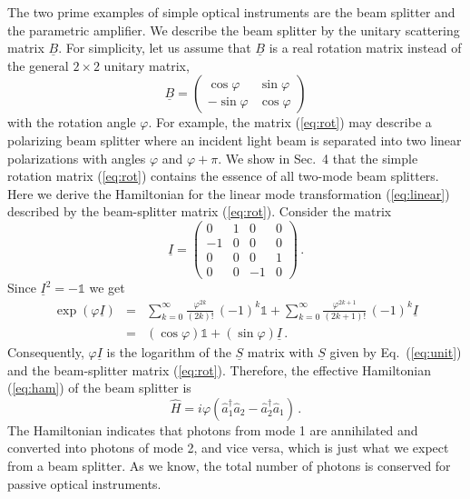 \documentclass[12pt,amsmath,amssymb]{article}
\numberwithin{equation}{section}
\begin{document}
The two prime examples of simple optical instruments are the beam
splitter and the parametric amplifier. We describe the beam
splitter by the unitary scattering matrix $\underline{B}$. For
simplicity, let us assume that $\underline{B}$ is a real rotation
matrix instead of the general $2 \times 2$ unitary matrix,
\begin{equation}
\label{eq:rot} \underline{B} = \left(
    \begin{array}{cc}
      \cos\varphi & \sin\varphi \\
       -\sin\varphi & \cos\varphi
    \end{array}
\right)
\end{equation}
with the rotation angle $\varphi$. For example, the matrix
(\ref{eq:rot}) may describe a polarizing beam splitter where an
incident light beam is separated into two linear polarizations
with angles $\varphi$ and $\varphi+\pi$. We show in Sec.\ 4 that
the simple rotation matrix (\ref{eq:rot}) contains the essence of
all two-mode beam splitters. Here we derive the Hamiltonian for
the linear mode transformation (\ref{eq:linear}) described by the
beam-splitter matrix (\ref{eq:rot}). Consider the matrix
\begin{equation}
\underline{I} =
    \left(
    \begin{array}{cccc}
      0&1&0&0\\-1&0&0&0\\0&0&0&1\\0&0&-1&0
    \end{array}
\right) \,.
\end{equation}
Since $\underline{I}^2 = -\mathds{1}$ we get
\begin{eqnarray}
\exp(\varphi\underline{I}) &=& \sum_{k=0}^\infty
\frac{\varphi^{2k}}{(2k)!}\,(-1)^k \mathds{1} + \sum_{k=0}^\infty
\frac{\varphi^{2k+1}}{(2k+1)!}\,(-1)^k \underline{I} \nonumber\\
&=& (\cos\varphi)\mathds{1} + (\sin\varphi) \underline{I} \,.
\end{eqnarray}
Consequently, $\varphi\underline{I}$ is the logarithm of the
$\underline{S}$ matrix with $\underline{S}$ given by Eq.\
(\ref{eq:unit}) and the beam-splitter matrix (\ref{eq:rot}).
Therefore, the effective Hamiltonian
(\ref{eq:ham}) of the beam splitter is
\begin{equation}
\label{eq:hbeam} \hat{H} =
i\varphi\left(\hat{a}_1^\dagger\hat{a}_2 -
\hat{a}_2^\dagger\hat{a}_1\right) \,.
\end{equation}
The Hamiltonian indicates that photons from mode 1 are
annihilated and converted into photons of mode 2, and vice versa,
which is just what we expect from a beam splitter.
As we know, the total
number of photons is conserved for passive optical instruments.
\end{document}
